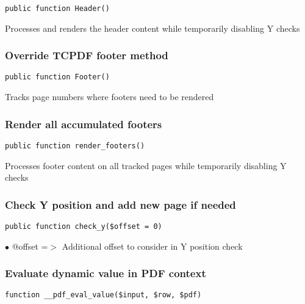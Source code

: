 \documentclass[a4paper]{article}
\begin{document}
\begin{lstlisting}
public function Header()
\end{lstlisting}

Processes and renders the header content while temporarily disabling Y checks

\hypertarget{toc507}{}
\subsubsection{Override TCPDF footer method}

\begin{lstlisting}
public function Footer()
\end{lstlisting}

Tracks page numbers where footers need to be rendered

\hypertarget{toc508}{}
\subsubsection{Render all accumulated footers}

\begin{lstlisting}
public function render_footers()
\end{lstlisting}

Processes footer content on all tracked pages while temporarily disabling Y checks

\hypertarget{toc509}{}
\subsubsection{Check Y position and add new page if needed}

\begin{lstlisting}
public function check_y($offset = 0)
\end{lstlisting}

\begin{compactitem}
\item[\color{myblue}$\bullet$] @offset =$>$ Additional offset to consider in Y position check
\end{compactitem}

\hypertarget{toc510}{}
\subsubsection{Evaluate dynamic value in PDF context}

\begin{lstlisting}
function __pdf_eval_value($input, $row, $pdf)
\end{lstlisting}
\end{document}
